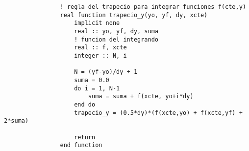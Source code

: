 \begin{lstlisting}
                ! regla del trapecio para integrar funciones f(cte,y)
                real function trapecio_y(yo, yf, dy, xcte)
                    implicit none
                    real :: yo, yf, dy, suma
                    ! funcion del integrando
                    real :: f, xcte
                    integer :: N, i
        
                    N = (yf-yo)/dy + 1
                    suma = 0.0
                    do i = 1, N-1
                        suma = suma + f(xcte, yo+i*dy)
                    end do
                    trapecio_y = (0.5*dy)*(f(xcte,yo) + f(xcte,yf) + 2*suma)
        
                    return
                end function
\end{lstlisting}